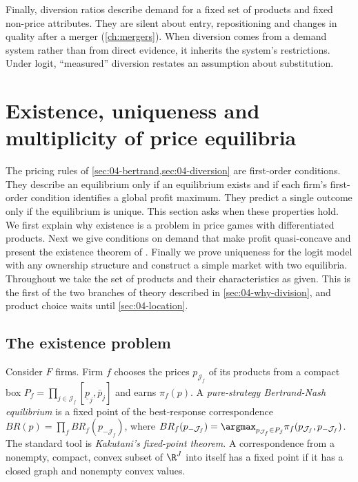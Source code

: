 Finally, diversion ratios describe demand for a fixed set of products and fixed non-price attributes. They are
silent about entry, repositioning and changes in quality after a merger (\cref{ch:mergers}). When diversion
comes from a demand system rather than from direct evidence, it inherits the system's restrictions. Under
logit, ``measured'' diversion restates an assumption about substitution.

\section{Existence, uniqueness and multiplicity of price equilibria}\label{sec:04-existence}

The pricing rules of \cref{sec:04-bertrand,sec:04-diversion} are first-order conditions. They describe an
equilibrium only if an equilibrium exists and if each firm's first-order condition identifies a global profit
maximum. They predict a single outcome only if the equilibrium is unique. This section asks when these
properties hold. We first explain why existence is a problem in price games with differentiated products. Next
we give conditions on demand that make profit quasi-concave and present the existence theorem of
\citet{CaplinNalebuff1991}. Finally we prove uniqueness for the logit model with any ownership structure and
construct a simple market with two equilibria. Throughout we take the set of products and their characteristics
as given. This is the first of the two branches of theory described in \cref{sec:04-why-division}, and product
choice waits until \cref{sec:04-location}.

\subsection{The existence problem}\label{sec:04-existence-problem}

Consider $F$ firms. Firm $f$ chooses the prices $p_{\mathcal{J}_f}$ of its products from a compact box
$P_f = \prod_{j \in \mathcal{J}_f}[\underline{p}_j, \bar{p}_j]$ and earns $\pi_f(p)$. A \emph{pure-strategy
Bertrand-Nash equilibrium} is a fixed point of the best-response correspondence
$BR(p) = \prod_f BR_f(p_{-\mathcal{J}_f})$, where
$BR_f(p_{-\mathcal{J}_f}) = \argmax_{p_{\mathcal{J}_f} \in P_f}\pi_f(p_{\mathcal{J}_f}, p_{-\mathcal{J}_f})$.
The standard tool is \emph{Kakutani's fixed-point theorem}. A correspondence from a nonempty, compact, convex
subset of $\R^J$ into itself has a fixed point if it has a closed graph and nonempty convex values.


